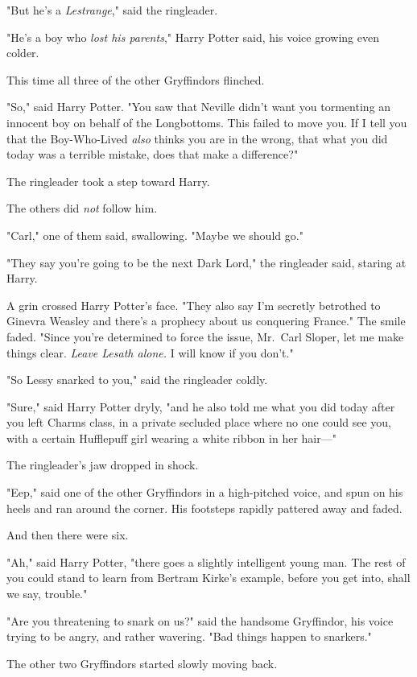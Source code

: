 "But he's a \emph{Lestrange}," said the ringleader.

"He's a boy who \emph{lost his parents}," Harry Potter said, his voice growing
even colder.

This time all three of the other Gryffindors flinched.

"So," said Harry Potter. "You saw that Neville didn't want you tormenting an
innocent boy on behalf of the Longbottoms. This failed to move you. If I tell
you that the Boy-Who-Lived \emph{also} thinks you are in the wrong, that what
you did today was a terrible mistake, does that make a difference?"

The ringleader took a step toward Harry.

The others did \emph{not} follow him.

"Carl," one of them said, swallowing. "Maybe we should go."

"They say you're going to be the next Dark Lord," the ringleader said, staring
at Harry.

A grin crossed Harry Potter's face. "They also say I'm secretly betrothed to
Ginevra Weasley and there's a prophecy about us conquering France." The smile
faded. "Since you're determined to force the issue, Mr.~Carl Sloper, let me
make things clear. \emph{Leave Lesath alone.} I will know if you don't."

"So Lessy snarked to you," said the ringleader coldly.

"Sure," said Harry Potter dryly, "and he also told me what you did today after
you left Charms class, in a private secluded place where no one could see you,
with a certain Hufflepuff girl wearing a white ribbon in her hair\mbox{---}"

The ringleader's jaw dropped in shock.

"Eep," said one of the other Gryffindors in a high-pitched voice, and spun on
his heels and ran around the corner. His footsteps rapidly pattered away and
faded.

And then there were six.

"Ah," said Harry Potter, "there goes a slightly intelligent young man. The rest
of you could stand to learn from Bertram Kirke's example, before you get into,
shall we say, trouble."

"Are you threatening to snark on us?" said the handsome Gryffindor, his voice
trying to be angry, and rather wavering. "Bad things happen to snarkers."

The other two Gryffindors started slowly moving back.

